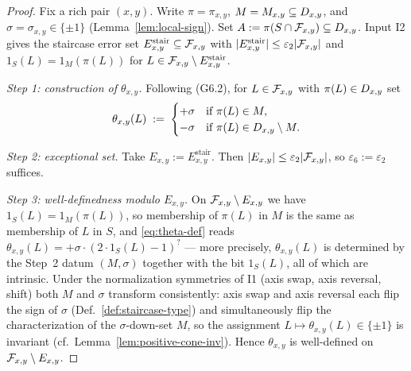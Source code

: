 \begin{proof}
Fix a rich pair $(x,y)$. Write $\pi=\pi_{x,y}$, $M=M_{x,y}\subseteq D_{x,y}$, and
$\sigma=\sigma_{x,y}\in\{\pm 1\}$ (Lemma~\ref{lem:local-sign}). Set
$A:=\pi(S\cap\mathcal{F}_{x,y})\subseteq D_{x,y}$. Input \textsc{I2} gives the staircase error
set $E^{\mathrm{stair}}_{x,y}\subseteq\mathcal{F}_{x,y}$ with
$|E^{\mathrm{stair}}_{x,y}|\le\varepsilon_2|\mathcal{F}_{x,y}|$ and
$1_S(L)=1_M(\pi(L))$ for $L\in\mathcal{F}_{x,y}\setminus E^{\mathrm{stair}}_{x,y}$.

\smallskip
\emph{Step 1: construction of $\theta_{x,y}$.}
Following (G6.2), for $L\in\mathcal{F}_{x,y}$ with $\pi(L)\in D_{x,y}$ set
\begin{equation}\label{eq:theta-def}
  \theta_{x,y}(L)\;:=\;
  \begin{cases}
    +\sigma & \text{if } \pi(L)\in M,\\
    -\sigma & \text{if } \pi(L)\in D_{x,y}\setminus M.
  \end{cases}
\end{equation}

\emph{Step 2: exceptional set.}
Take $E_{x,y}:=E^{\mathrm{stair}}_{x,y}$. Then $|E_{x,y}|\le\varepsilon_2|\mathcal{F}_{x,y}|$,
so $\varepsilon_6:=\varepsilon_2$ suffices.

\smallskip
\emph{Step 3: well-definedness modulo $E_{x,y}$.}
On $\mathcal{F}_{x,y}\setminus E_{x,y}$ we have $1_S(L)=1_M(\pi(L))$, so membership of
$\pi(L)$ in $M$ is the same as membership of $L$ in $S$, and
\eqref{eq:theta-def} reads $\theta_{x,y}(L)=+\sigma\cdot(2\cdot 1_S(L)-1)^{?}$
--- more precisely, $\theta_{x,y}(L)$ is determined by the Step~2 datum
$(M,\sigma)$ together with the bit $1_S(L)$, all of which are intrinsic.
Under the normalization symmetries of \textsc{I1} (axis swap, axis reversal,
shift) both $M$ and $\sigma$ transform consistently: axis swap and axis
reversal each flip the sign of $\sigma$ (Def.~\ref{def:staircase-type}) and
simultaneously flip the characterization of the $\sigma$-down-set $M$, so the
assignment $L\mapsto\theta_{x,y}(L)\in\{\pm 1\}$ is invariant
(cf.~Lemma~\ref{lem:positive-cone-inv}). Hence $\theta_{x,y}$ is
well-defined on $\mathcal{F}_{x,y}\setminus E_{x,y}$.


\end{proof}
